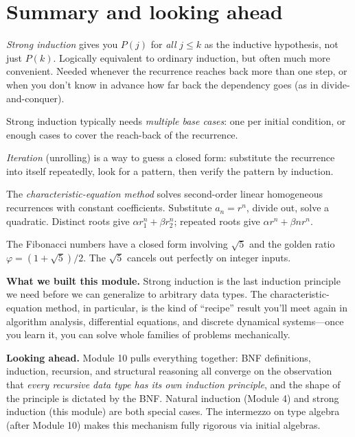 \documentclass[11pt]{article}
\begin{document}
\section{Summary and looking ahead}

\begin{keytakeaway}
  \item \emph{Strong induction} gives you $P(j)$ for \emph{all} $j \leq k$ as the inductive hypothesis, not just $P(k)$. Logically equivalent to ordinary induction, but often much more convenient. Needed whenever the recurrence reaches back more than one step, or when you don't know in advance how far back the dependency goes (as in divide-and-conquer).
  \item Strong induction typically needs \emph{multiple base cases}: one per initial condition, or enough cases to cover the reach-back of the recurrence.
  \item \emph{Iteration} (unrolling) is a way to guess a closed form: substitute the recurrence into itself repeatedly, look for a pattern, then verify the pattern by induction.
  \item The \emph{characteristic-equation method} solves second-order linear homogeneous recurrences with constant coefficients. Substitute $a_n = r^n$, divide out, solve a quadratic. Distinct roots give $\alpha r_1^n + \beta r_2^n$; repeated roots give $\alpha r^n + \beta n r^n$.
  \item The Fibonacci numbers have a closed form involving $\sqrt{5}$ and the golden ratio $\varphi = (1 + \sqrt{5})/2$. The $\sqrt{5}$ cancels out perfectly on integer inputs.
\end{keytakeaway}

\begin{summarybox}
\textbf{What we built this module.} Strong induction is the last induction principle we need before we can generalize to arbitrary data types. The characteristic-equation method, in particular, is the kind of ``recipe'' result you'll meet again in algorithm analysis, differential equations, and discrete dynamical systems---once you learn it, you can solve whole families of problems mechanically.

\medskip
\textbf{Looking ahead.} Module 10 pulls everything together: BNF definitions, induction, recursion, and structural reasoning all converge on the observation that \emph{every recursive data type has its own induction principle}, and the shape of the principle is dictated by the BNF. Natural induction (Module 4) and strong induction (this module) are both special cases. The intermezzo on type algebra (after Module 10) makes this mechanism fully rigorous via initial algebras.
\end{summarybox}
\end{document}
